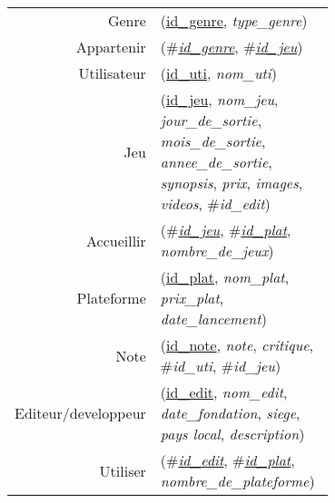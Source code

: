 
\usepackage[normalem]{ulem}
\newenvironment{mld}
  {\par\begin{minipage}{\linewidth}\begin{tabular}{rp{0.7\linewidth}}}
  {\end{tabular}\end{minipage}\par}
\newcommand{\relat}[1]{\textsc{#1}}
\newcommand{\attr}[1]{\emph{#1}}
\newcommand{\prim}[1]{\uline{#1}}
\newcommand{\foreign}[1]{\#\textsl{#1}}


\begin{mld}
  Genre & (\prim{id\_genre}, \attr{type\_genre})\\
  Appartenir & (\foreign{\prim{id\_genre}}, \foreign{\prim{id\_jeu}})\\
  Utilisateur & (\prim{id\_uti}, \attr{nom\_uti})\\
  Jeu & (\prim{id\_jeu}, \attr{nom\_jeu}, \attr{jour\_de\_sortie}, \attr{mois\_de\_sortie}, \attr{annee\_de\_sortie}, \attr{synopsis}, \attr{prix}, \attr{images}, \attr{videos}, \foreign{id\_edit})\\
  Accueillir & (\foreign{\prim{id\_jeu}}, \foreign{\prim{id\_plat}}, \attr{nombre\_de\_jeux})\\
  Plateforme & (\prim{id\_plat}, \attr{nom\_plat}, \attr{prix\_plat}, \attr{date\_lancement})\\
  Note & (\prim{id\_note}, \attr{note}, \attr{critique}, \foreign{id\_uti}, \foreign{id\_jeu})\\
  Editeur/developpeur & (\prim{id\_edit}, \attr{nom\_edit}, \attr{date\_fondation}, \attr{siege}, \attr{pays local}, \attr{description})\\
  Utiliser & (\foreign{\prim{id\_edit}}, \foreign{\prim{id\_plat}}, \attr{nombre\_de\_plateforme})\\
\end{mld}